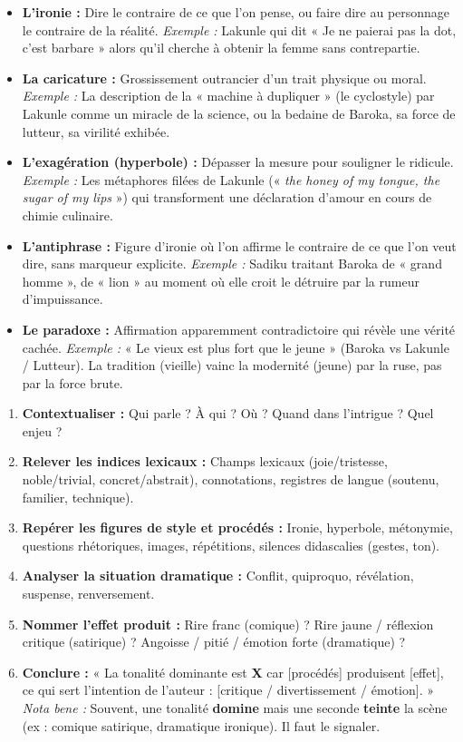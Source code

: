 \documentclass[11pt]{article}
\newcommand{\cle}[1]{{\popxbold\color{popdark}#1}}
\begin{document}
\begin{itemize}
    \item \textbf{L'\cle{ironie} :} Dire le contraire de ce que l'on pense, ou faire dire au personnage le contraire de la réalité. \emph{Exemple :} Lakunle qui dit « Je ne paierai pas la dot, c'est barbare » alors qu'il cherche à obtenir la femme sans contrepartie.
    \item \textbf{La \cle{caricature} :} Grossissement outrancier d'un trait physique ou moral. \emph{Exemple :} La description de la « machine à dupliquer » (le cyclostyle) par Lakunle comme un miracle de la science, ou la bedaine de Baroka, sa force de lutteur, sa virilité exhibée.
    \item \textbf{L'\cle{exagération} (hyperbole) :} Dépasser la mesure pour souligner le ridicule. \emph{Exemple :} Les métaphores filées de Lakunle (« \emph{the honey of my tongue, the sugar of my lips} ») qui transforment une déclaration d'amour en cours de chimie culinaire.
    \item \textbf{L'\cle{antiphrase} :} Figure d'ironie où l'on affirme le contraire de ce que l'on veut dire, sans marqueur explicite. \emph{Exemple :} Sadiku traitant Baroka de « grand homme », de « lion » au moment où elle croit le détruire par la rumeur d'impuissance.
    \item \textbf{Le \cle{paradoxe} :} Affirmation apparemment contradictoire qui révèle une vérité cachée. \emph{Exemple :} « Le vieux est plus fort que le jeune » (Baroka vs Lakunle / Lutteur). La tradition (vieille) vainc la modernité (jeune) par la ruse, pas par la force brute.
\end{itemize}

\begin{methode}
\begin{enumerate}
    \item \textbf{Contextualiser :} Qui parle ? À qui ? Où ? Quand dans l'intrigue ? Quel enjeu ?
    \item \textbf{Relever les indices lexicaux :} Champs lexicaux (joie/tristesse, noble/trivial, concret/abstrait), connotations, registres de langue (soutenu, familier, technique).
    \item \textbf{Repérer les figures de style et procédés :} Ironie, hyperbole, métonymie, questions rhétoriques, images, répétitions, silences didascalies (gestes, ton).
    \item \textbf{Analyser la situation dramatique :} Conflit, quiproquo, révélation, suspense, renversement.
    \item \textbf{Nommer l'effet produit :} Rire franc (comique) ? Rire jaune / réflexion critique (satirique) ? Angoisse / pitié / émotion forte (dramatique) ?
    \item \textbf{Conclure :} « La tonalité dominante est \textbf{X} car [procédés] produisent [effet], ce qui sert l'intention de l'auteur : [critique / divertissement / émotion]. » \textit{Nota bene :} Souvent, une tonalité \textbf{domine} mais une seconde \textbf{teinte} la scène (ex : comique satirique, dramatique ironique). Il faut le signaler.
\end{enumerate}
\end{methode}
\end{document}
